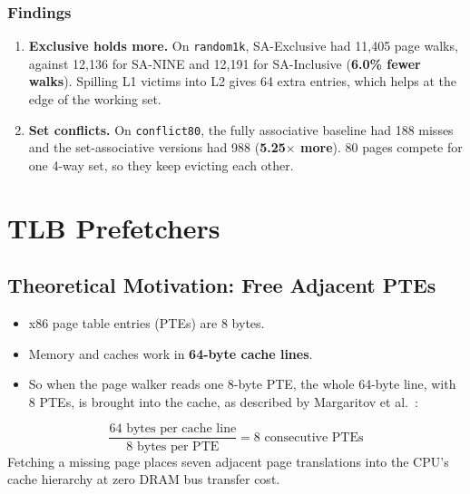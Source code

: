 \subsubsection{Findings}
\begin{enumerate}
    \item \textbf{Exclusive holds more.} On \texttt{random1k}, SA-Exclusive had 11,405 page walks, against 12,136 for SA-NINE and 12,191 for SA-Inclusive (\textbf{6.0\% fewer walks}). Spilling L1 victims into L2 gives 64 extra entries, which helps at the edge of the working set.
    \item \textbf{Set conflicts.} On \texttt{conflict80}, the fully associative baseline had 188 misses and the set-associative versions had 988 (\textbf{5.25$\times$ more}). 80 pages compete for one 4-way set, so they keep evicting each other.
\end{enumerate}

\section{TLB Prefetchers}

\subsection{Theoretical Motivation: Free Adjacent PTEs}
\begin{itemize}
    \item x86 page table entries (PTEs) are 8 bytes.
    \item Memory and caches work in \textbf{64-byte cache lines}.
    \item So when the page walker reads one 8-byte PTE, the whole 64-byte line, with 8 PTEs, is brought into the cache, as described by Margaritov et al.~\cite{margaritov2019prefetched}:
\end{itemize}
\begin{equation}
    \frac{64\text{ bytes per cache line}}{8\text{ bytes per PTE}} = 8\text{ consecutive PTEs}
\end{equation}
Fetching a missing page places seven adjacent page translations into the CPU's cache hierarchy at zero DRAM bus transfer cost.

